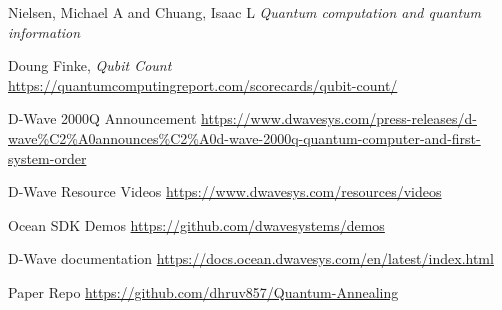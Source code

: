 \documentclass[12pt,conference]{IEEEtran}
\begin{document}
\begin{thebibliography}{r1}

Nielsen, Michael A and Chuang, Isaac L \emph{Quantum computation and quantum information}

Doung Finke, \emph{Qubit Count} \url{https://quantumcomputingreport.com/scorecards/qubit-count/}

D-Wave 2000Q Announcement \url{https://www.dwavesys.com/press-releases/d-wave%C2%A0announces%C2%A0d-wave-2000q-quantum-computer-and-first-system-order}

D-Wave Resource Videos \url{https://www.dwavesys.com/resources/videos}

Ocean SDK Demos \url{https://github.com/dwavesystems/demos}

D-Wave documentation \url{https://docs.ocean.dwavesys.com/en/latest/index.html}

Paper Repo \url{https://github.com/dhruv857/Quantum-Annealing}

\end{thebibliography}
\end{document}
